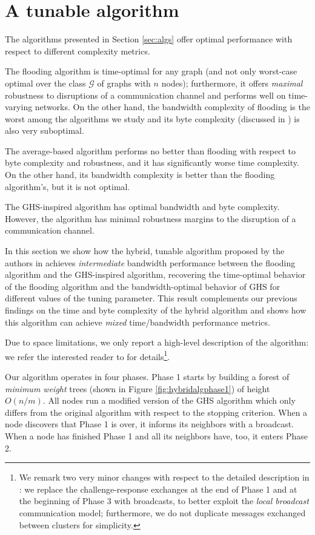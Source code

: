 \documentclass[letterpaper,10pt,conference]{ieeeconf}
\begin{document}
\section{A tunable algorithm}
\label{sec:tunable}
The algorithms presented in Section \ref{sec:algs} offer optimal performance with respect to different complexity metrics.\

The flooding algorithm is time-optimal for any graph (and not only worst-case optimal over the class $\mathcal G$ of graphs with $n$ nodes); furthermore, it offers \emph{maximal} robustness to disruptions of a communication channel and performs well on time-varying networks. On the other hand, the bandwidth complexity of flooding is the worst among the algorithms we study and its byte complexity (discussed in \cite{FR-MP:13}) is also very suboptimal.

The average-based algorithm performs no better than flooding with respect to byte complexity and robustness, and it has significantly worse time complexity. On the other hand, its bandwidth complexity is better than the flooding algorithm's, but it is not optimal.

The GHS-inspired algorithm has optimal bandwidth and byte complexity. However, the algorithm has minimal robustness margins to the disruption of a communication channel.

In this section we show how the hybrid, tunable algorithm proposed by the authors in \cite{FR-MP:13} achieves \emph{intermediate} bandwidth performance between the flooding algorithm and the GHS-inspired algorithm, recovering the time-optimal behavior of the flooding algorithm and the bandwidth-optimal behavior of GHS for different values of the tuning parameter. This result complements our previous findings on the time and byte complexity of the hybrid algorithm and shows how this algorithm can achieve \emph{mixed} time/bandwidth performance metrics. 

Due to space limitations, we only report a high-level description of the algorithm: we refer the interested reader to \cite{FR-MP:13} for details\footnote{We remark two very minor changes with respect to the detailed description in \cite{FR-MP:13}: we replace the challenge-response exchanges at the end of Phase 1 and at the beginning of Phase 3 with broadcasts, to better exploit the \emph{local broadcast} communication model; furthermore, we do not duplicate messages exchanged between clusters for simplicity.}.

Our algorithm operates in four phases. 
Phase 1 starts by building a forest of \emph{minimum weight} trees (shown in Figure \ref{fig:hybridalgphase1}) of height $O(n/m)$. 
All nodes run a modified version of the GHS algorithm \cite{RGG-PAH-PMS:83} which only differs from the original algorithm with respect to the stopping criterion. When a node discovers that Phase 1 is over, it informs its neighbors with a broadcast. When a node has finished Phase 1 and all its neighbors have, too, it enters Phase 2.
\end{document}
